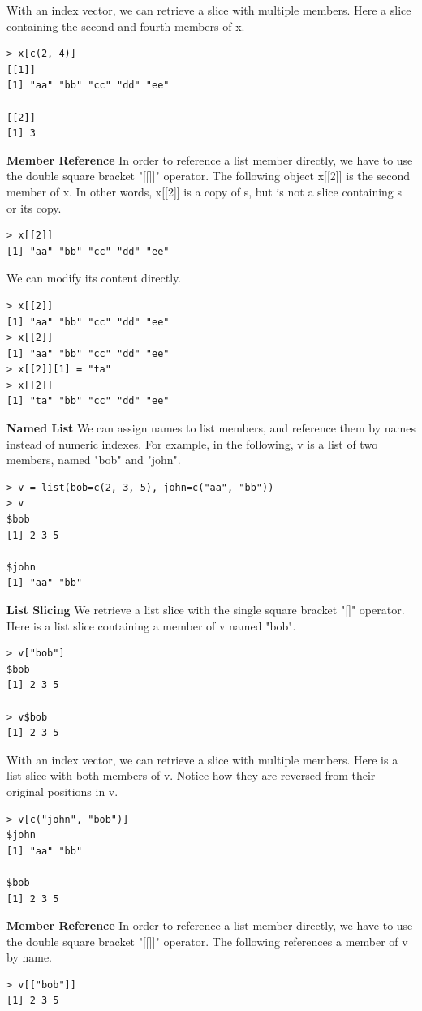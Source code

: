 With an index vector, we can retrieve a slice with multiple members. Here a slice containing the second and fourth members of x. 
\begin{lstlisting}[language=html]
> x[c(2, 4)]
[[1]]
[1] "aa" "bb" "cc" "dd" "ee"

[[2]]
[1] 3
\end{lstlisting}
\textbf{Member Reference}\newline
In order to reference a list member directly, we have to use the double square bracket "[[]]" operator. The following object x[[2]] is the second member of x. In other words, x[[2]] is a copy of s, but is not a slice containing s or its copy. 
\begin{lstlisting}[language=html]
> x[[2]]
[1] "aa" "bb" "cc" "dd" "ee"
\end{lstlisting}
We can modify its content directly. 
\begin{lstlisting}[language=html]
> x[[2]]
[1] "aa" "bb" "cc" "dd" "ee"
> x[[2]]
[1] "aa" "bb" "cc" "dd" "ee"
> x[[2]][1] = "ta"
> x[[2]]
[1] "ta" "bb" "cc" "dd" "ee"
\end{lstlisting}
\textbf{Named List }\newline
We can assign names to list members, and reference them by names instead of numeric indexes.
For example, in the following, v is a list of two members, named "bob" and "john".
\begin{lstlisting}[language=html] 
> v = list(bob=c(2, 3, 5), john=c("aa", "bb"))
> v
$bob
[1] 2 3 5

$john
[1] "aa" "bb"
\end{lstlisting}
\textbf{List Slicing}\newline
We retrieve a list slice with the single square bracket "[]" operator. Here is a list slice containing a member of v named "bob". 
\begin{lstlisting}[language=html]
> v["bob"]
$bob
[1] 2 3 5

> v$bob
[1] 2 3 5
\end{lstlisting}
With an index vector, we can retrieve a slice with multiple members. Here is a list slice with both members of v. Notice how they are reversed from their original positions in v. 
\begin{lstlisting}[language=html]
> v[c("john", "bob")]
$john
[1] "aa" "bb"

$bob
[1] 2 3 5
\end{lstlisting}
\textbf{Member Reference}\newline
In order to reference a list member directly, we have to use the double square bracket "[[]]" operator. The following references a member of v by name. 
\begin{lstlisting}[language=html]
> v[["bob"]]
[1] 2 3 5
\end{lstlisting}

